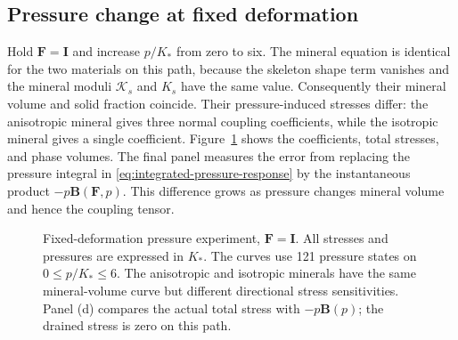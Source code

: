 \subsection{Pressure change at fixed deformation}
Hold \(\mathbf F=\mathbf I\) and increase \(p/K_*\) from zero to six.
The mineral equation is identical for the two materials on this path,
because the skeleton shape term vanishes and the mineral moduli
\(\mathcal{K}_s\) and \(K_s\) have the same value.
Consequently their mineral volume and solid fraction coincide. Their
pressure-induced stresses differ: the anisotropic mineral gives three
normal coupling coefficients, while the isotropic mineral gives a single
coefficient. Figure~\ref{fig:spherical-pressure} shows the coefficients,
total stresses, and phase volumes. The final panel measures the error
from replacing the pressure integral in
\eqref{eq:integrated-pressure-response} by the instantaneous product
\(-p\mathbf B(\mathbf F,p)\). This difference grows as pressure changes
mineral volume and hence the coupling tensor.
\begin{figure}[htbp]
 \centering
 \caption{Fixed-deformation pressure experiment, \(\mathbf F=\mathbf I\).
 All stresses and pressures are expressed in \(K_*\). The curves use 121
 pressure states on \(0\le p/K_*\le6\). The anisotropic and isotropic
 minerals have the same mineral-volume curve but different directional
 stress sensitivities. Panel (d) compares the actual total stress with
 \(-p\mathbf B(p)\); the drained stress is zero on this path.}
 \label{fig:spherical-pressure}
\end{figure}

